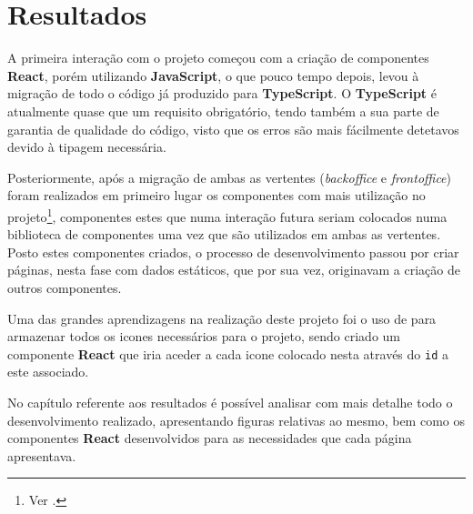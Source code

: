 \section{Resultados}

A primeira interação com o projeto começou com a criação de componentes \textbf{React}, porém utilizando \textbf{JavaScript}, o que pouco tempo depois, levou à migração de todo o código já produzido para \textbf{TypeScript}. O \textbf{TypeScript} é atualmente quase que um requisito obrigatório, tendo também a sua parte de garantia de qualidade do código, visto que os erros são mais fácilmente detetavos devido à tipagem necessária.

Posteriormente, após a migração de ambas as vertentes (\textit{backoffice} e \textit{frontoffice}) foram realizados em primeiro lugar os componentes com mais utilização no projeto\footnote{Ver .}, componentes estes que numa interação futura seriam colocados numa biblioteca de componentes uma vez que são utilizados em ambas as vertentes. Posto estes componentes criados, o processo de desenvolvimento passou por criar páginas, nesta fase com dados estáticos, que por sua vez, originavam a criação de outros componentes.

Uma das grandes aprendizagens na realização deste projeto foi o uso de  \textbf{} para armazenar todos os icones necessários para o projeto, sendo criado um componente \textbf{React} que iria aceder a cada icone colocado nesta  através do \texttt{id} a este associado.

No capítulo referente aos resultados é possível analisar com mais detalhe todo o desenvolvimento realizado, apresentando figuras relativas ao mesmo, bem como os componentes \textbf{React} desenvolvidos para as necessidades que cada página apresentava.